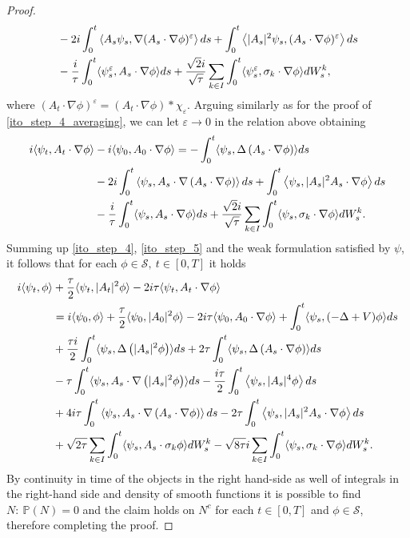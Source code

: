 \documentclass[a4paper,10pt]{amsart}
\renewcommand{\epsilon}{\varepsilon}
\theoremstyle{remark}
\numberwithin{equation}{section}
\begin{document}
\begin{proof}
\begin{align*}
     &  -2i\int_0^t\left\langle A_s \psi_s, \nabla (A_s\cdot\nabla\phi)^{\epsilon}\right\rangle ds  +\int_0^t\left\langle |A_s|^2\psi_s, (A_s\cdot\nabla\phi)^{\epsilon}\right\rangle ds\notag\\ & -\frac{i}{\tau}\int_0^t \langle \psi^{\epsilon}_s,A_s\cdot\nabla\phi\rangle ds+\frac{\sqrt{2}i}{\sqrt{\tau}}\sum_{k\in I }\int_0^t  \langle \psi^{\epsilon}_s,  \sigma_k\cdot\nabla\phi\rangle dW^k_s,
   \end{align*}
    where $(A_t\cdot\nabla\phi)^{\epsilon}=(A_t\cdot\nabla\phi)\ast \chi_{\epsilon}.$
Arguing similarly as for the proof of \eqref{ito_step_4_averaging}, we can let $\epsilon\rightarrow 0$ in the relation above obtaining
\begin{align}\label{ito_step_5_averaging}
    i\langle   \psi_t, A_t\cdot\nabla \phi\rangle&-i\langle   \psi_0, A_0\cdot\nabla \phi\rangle=-\int_0^t\langle\psi_s,\Delta\left(A_s\cdot\nabla \phi\right)\rangle ds \notag\\ 
     &  -2i\int_0^t\left\langle \psi_s, A_s\cdot\nabla\left(A_s\cdot\nabla\phi\right)\right\rangle ds  +\int_0^t\left\langle \psi_s, |A_s|^2A_s\cdot\nabla\phi\right\rangle ds\notag\\ & -\frac{i}{\tau}\int_0^t \langle \psi_s,A_s\cdot\nabla\phi\rangle ds+\frac{\sqrt{2}i}{\sqrt{\tau}}\sum_{k\in I }\int_0^t  \langle \psi_s,  \sigma_k\cdot\nabla\phi\rangle dW^k_s. 
\end{align}
Summing up \eqref{ito_step_4}, \eqref{ito_step_5} and the weak formulation satisfied by $\psi$, it follows that for each $\phi\in \mathscr{S},\ t\in [0,T]$ it holds
\begin{align*}
    i\langle \psi_t, \phi\rangle&+\frac{\tau}{2}\langle \psi_t,|A_t|^2\phi\rangle-2i\tau\langle \psi_t, A_t\cdot\nabla \phi\rangle\\ & =i\langle \psi_0, \phi\rangle+\frac{\tau}{2}\langle \psi_0,|A_0|^2\phi\rangle-2i\tau\langle \psi_0, A_0\cdot\nabla \phi\rangle+\int_0^t \langle \psi_s, (-\Delta+V)\phi\rangle ds\\ & +\frac{\tau i}{2}\int_0^t\langle\psi_s,\Delta\left(|A_s|^2 \phi\right)\rangle ds+2\tau\int_0^t\langle\psi_s,\Delta\left(A_s\cdot\nabla \phi\right)\rangle ds\\& -\tau\int_0^t \langle \psi_s, A_s\cdot\nabla\left(|A_s|^2\phi\right)\rangle ds -\frac{i\tau}{2}\int_0^t\left\langle \psi_s,  |A_s|^4\phi\right\rangle ds\\ & +4i\tau\int_0^t\left\langle \psi_s, A_s\cdot\nabla\left(A_s\cdot\nabla\phi\right)\right\rangle ds -2\tau\int_0^t\left\langle \psi_s, |A_s|^2 A_s\cdot\nabla\phi\right\rangle ds\notag
     \\ &+\sqrt{2\tau}\sum_{k\in I }\int_0^t  \langle \psi_s, A_s\cdot \sigma_k \phi\rangle dW^k_s -\sqrt{8\tau}i\sum_{k\in I }\int_0^t  \langle \psi_s,  \sigma_k\cdot\nabla\phi\rangle dW^k_s. 
\end{align*}
   By continuity in time of the objects in the right hand-side as well of integrals in the right-hand side and density of smooth functions it is possible to find $N:\ \mathbb{P}(N)=0$ and the claim holds on $N^c$ for each $t\in [0,T]$ and $\phi\in \mathscr{S}$, therefore completing the proof.
 \end{proof}  
\fi
\end{document}
